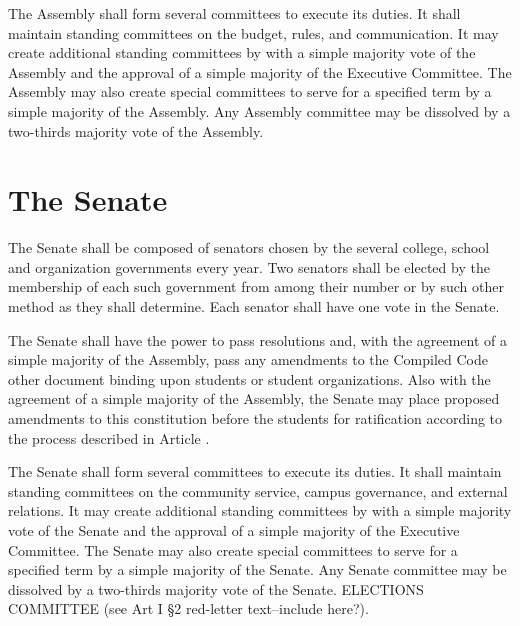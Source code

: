     The Assembly shall form several committees to execute its duties. It shall maintain standing committees on the budget, rules, and communication. It may create additional standing committees by with a simple majority vote of the Assembly and the approval of a simple majority of the Executive Committee. The Assembly may also create special committees to serve for a specified term by a simple majority of the Assembly. Any Assembly committee may be dissolved by a two-thirds majority vote of the Assembly.

\section{The Senate}
    The Senate shall be composed of senators chosen by the several college, school and organization governments every year. Two senators shall be elected by the membership of each such government from among their number or by such other method as they shall determine. Each senator shall have one vote in the Senate.

    The Senate shall have the power to pass resolutions and, with the agreement of a simple majority of the Assembly, pass any amendments to the Compiled Code other document binding upon students or student organizations. Also with the agreement of a simple majority of the Assembly, the Senate may place proposed amendments to this constitution before the students for ratification according to the process described in Article . 

    The Senate shall form several committees to execute its duties. It shall maintain standing committees on the community service, campus governance, and external relations. It may create additional standing committees by with a simple majority vote of the Senate and the approval of a simple majority of the Executive Committee. The Senate may also create special committees to serve for a specified term by a simple majority of the Senate. Any Senate committee may be dissolved by a two-thirds majority vote of the Senate. ELECTIONS COMMITTEE (see Art I \S2 red-letter text--include here?).